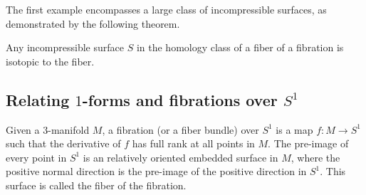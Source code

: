 The first example encompasses a large class of incompressible surfaces, as demonstrated by the following theorem.
\begin{thm}
  \label{thm:ThurIsotope}
  Any incompressible surface $S$ in the homology class of a fiber of a fibration is isotopic to the fiber.
\end{thm}


\subsection{Relating $1$-forms and fibrations over $S^1$}
\label{sec:relating-1-forms}
  Given a $3$-manifold $M$, a fibration (or a fiber bundle) over $S^1$ is a map $f: M \to S^1$ such
  that the derivative of $f$ has full rank at all points in $M$. The pre-image of every point in
  $S^1$ is an relatively oriented embedded surface in $M$, where the positive normal direction is
  the pre-image of the positive direction in $S^1$. This surface is called the fiber of the
  fibration.

